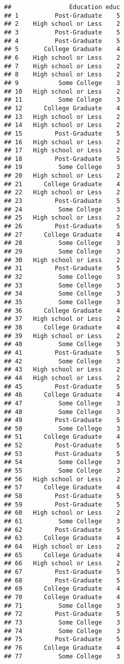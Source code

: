 \documentclass[
]{article}
\begin{document}
\begin{verbatim}
##                Education educ
## 1          Post-Graduate    5
## 2    High school or Less    2
## 3          Post-Graduate    5
## 4          Post-Graduate    5
## 5       College Graduate    4
## 6    High school or Less    2
## 7    High school or Less    2
## 8    High school or Less    2
## 9           Some College    3
## 10   High school or Less    2
## 11          Some College    3
## 12      College Graduate    4
## 13   High school or Less    2
## 14   High school or Less    2
## 15         Post-Graduate    5
## 16   High school or Less    2
## 17   High school or Less    2
## 18         Post-Graduate    5
## 19          Some College    3
## 20   High school or Less    2
## 21      College Graduate    4
## 22   High school or Less    2
## 23         Post-Graduate    5
## 24          Some College    3
## 25   High school or Less    2
## 26         Post-Graduate    5
## 27      College Graduate    4
## 28          Some College    3
## 29          Some College    3
## 30   High school or Less    2
## 31         Post-Graduate    5
## 32          Some College    3
## 33          Some College    3
## 34          Some College    3
## 35          Some College    3
## 36      College Graduate    4
## 37   High school or Less    2
## 38      College Graduate    4
## 39   High school or Less    2
## 40          Some College    3
## 41         Post-Graduate    5
## 42          Some College    3
## 43   High school or Less    2
## 44   High school or Less    2
## 45         Post-Graduate    5
## 46      College Graduate    4
## 47          Some College    3
## 48          Some College    3
## 49         Post-Graduate    5
## 50          Some College    3
## 51      College Graduate    4
## 52         Post-Graduate    5
## 53         Post-Graduate    5
## 54          Some College    3
## 55          Some College    3
## 56   High school or Less    2
## 57      College Graduate    4
## 58         Post-Graduate    5
## 59         Post-Graduate    5
## 60   High school or Less    2
## 61          Some College    3
## 62         Post-Graduate    5
## 63      College Graduate    4
## 64   High school or Less    2
## 65      College Graduate    4
## 66   High school or Less    2
## 67         Post-Graduate    5
## 68         Post-Graduate    5
## 69      College Graduate    4
## 70      College Graduate    4
## 71          Some College    3
## 72         Post-Graduate    5
## 73          Some College    3
## 74          Some College    3
## 75         Post-Graduate    5
## 76      College Graduate    4
## 77          Some College    3

\end{verbatim}
\end{document}
